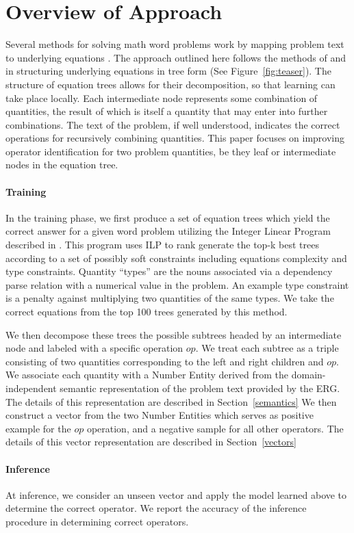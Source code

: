 \section{Overview of Approach}
Several methods for solving math word problems work by mapping problem text to underlying equations \cite{kushman2014learning,koncel2015parsing,roy2015solving}.
The approach outlined here follows the methods of  and \cite{roy2015solving} in structuring underlying equations in tree form (See Figure~\ref{fig:teaser}).
The structure of equation trees allows for their decomposition, so that learning can take place locally. 
Each intermediate node represents some combination of quantities, the result of which is itself a quantity that may enter into further combinations. 
The text of the problem, if well understood, indicates the correct operations for recursively combining quantities. 
This paper focuses on improving operator identification for two problem quantities, be they leaf or intermediate nodes in the equation tree. 

\paragraph{Training}
In the training phase, we first produce a set of equation trees which yield the correct answer for a given word problem utilizing the Integer Linear Program described in . 
This program uses ILP to rank generate the top-k best trees according to a set of possibly soft constraints including equations complexity and type constraints.
Quantity ``types'' are the nouns associated via a dependency parse relation with a numerical value in the problem.
An example type constraint is a penalty against multiplying two quantities of the same types. 
We take the correct equations from the top 100 trees generated by this method.

We then decompose these trees the possible subtrees headed by an intermediate node and labeled with a specific operation $op$.
We treat each subtree as a triple consisting of two quantities corresponding to the left and right children and $op$. 
We associate each quantity with a Number Entity derived from the domain-independent semantic representation of the problem text provided by the ERG. 
The details of this representation are described in Section~\ref{semantics}
We then construct a vector from the two Number Entities which serves as positive example for the $op$ operation, and a negative sample for all other operators. 
The details of this vector representation are described in Section~\ref{vectors}

\paragraph{Inference} At inference, we consider an unseen vector and apply the model learned above to determine the correct operator. 
We report the accuracy of the inference procedure in determining correct operators. 
